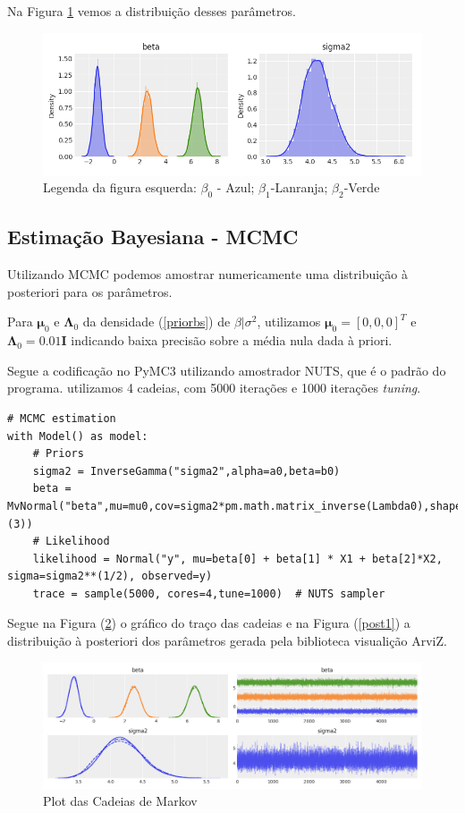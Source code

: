 \documentclass[12pt,letterpaper]{article}
\newcommand{\bd}[1]{\boldsymbol{#1}}
\begin{document}
	Na Figura \ref{postplot} vemos a distribuição desses parâmetros.
	
	\begin{figure}[!htb]
		\centering
		\includegraphics[scale=0.80]{../images/posterior_sampling.png}
		\caption{Legenda da figura esquerda: $\beta_0$ - Azul; $\beta_1$-Lanranja; $\beta_2$-Verde}
		\label{postplot}
	\end{figure}
	\subsection{Estimação Bayesiana - MCMC}
	
	Utilizando MCMC podemos amostrar numericamente uma distribuição à posteriori para os parâmetros. 
	
	Para $\bd\mu_0$ e $\bd\Lambda_0$ da densidade (\ref{priorbs}) de $\beta|\sigma^2$, utilizamos $\bd\mu_0=[0,0,0]^T$ e $\bd\Lambda_0=0.01\bd I$ indicando baixa precisão sobre a média nula dada à priori.
	
	Segue a codificação no PyMC3 utilizando amostrador NUTS, que é o padrão do programa. utilizamos 4 cadeias, com 5000 iterações e 1000 iterações \textit{tuning}.
	
	\begin{lstlisting}[language=iPython]
# MCMC estimation
with Model() as model:  
	# Priors
	sigma2 = InverseGamma("sigma2",alpha=a0,beta=b0)
	beta = MvNormal("beta",mu=mu0,cov=sigma2*pm.math.matrix_inverse(Lambda0),shape=(3))
	# Likelihood
	likelihood = Normal("y", mu=beta[0] + beta[1] * X1 + beta[2]*X2, sigma=sigma2**(1/2), observed=y)
	trace = sample(5000, cores=4,tune=1000)  # NUTS sampler
	\end{lstlisting}
	
	Segue na Figura (\ref{traceplot1}) 
	o gráfico do traço das cadeias e na Figura (\ref{post1})
	a distribuição à posteriori dos parâmetros gerada pela biblioteca visualição ArviZ\cite{arviz_2019}.            	
	\begin{figure}[!htb]
		\centering
		\includegraphics[scale=0.6]{../images/traceplot1.png}
		
		\caption{Plot das Cadeias de Markov}
		\label{traceplot1}
	\end{figure}
	
\end{document}
